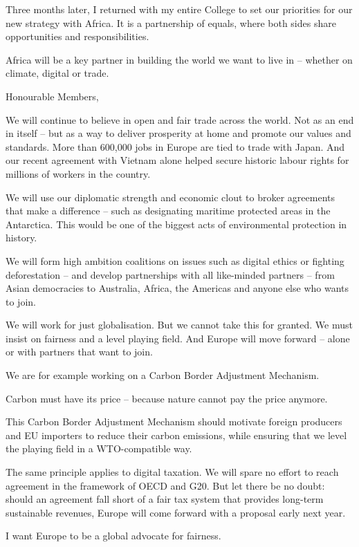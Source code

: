 \documentclass[a4paper,11pt]{article}
\begin{document}
Three months later, I returned with my entire College to set our priorities for our new strategy with Africa. It is a partnership of equals, where both sides share opportunities and responsibilities.

Africa will be a key partner in building the world we want to live in – whether on climate, digital or trade.

 

Honourable Members,

We will continue to believe in open and fair trade across the world.  Not as an end in itself – but as a way to deliver prosperity at home and promote our values and standards. More than 600,000 jobs in Europe are tied to trade with Japan. And our recent agreement with Vietnam alone helped secure historic labour rights for millions of workers in the country.

We will use our diplomatic strength and economic clout to broker agreements that make a difference – such as designating maritime protected areas in the Antarctica. This would be one of the biggest acts of environmental protection in history.

We will form high ambition coalitions on issues such as digital ethics or fighting deforestation – and develop partnerships with all like-minded partners – from Asian democracies to Australia, Africa, the Americas and anyone else who wants to join.

We will work for just globalisation. But we cannot take this for granted. We must insist on fairness and a level playing field. And Europe will move forward – alone or with partners that want to join.

We are for example working on a Carbon Border Adjustment Mechanism.

Carbon must have its price – because nature cannot pay the price anymore.

This Carbon Border Adjustment Mechanism should motivate foreign producers and EU importers to reduce their carbon emissions, while ensuring that we level the playing field in a WTO-compatible way.

The same principle applies to digital taxation. We will spare no effort to reach agreement in the framework of OECD and G20. But let there be no doubt: should an agreement fall short of a fair tax system that provides long-term sustainable revenues, Europe will come forward with a proposal early next year.

I want Europe to be a global advocate for fairness.
\end{document}
